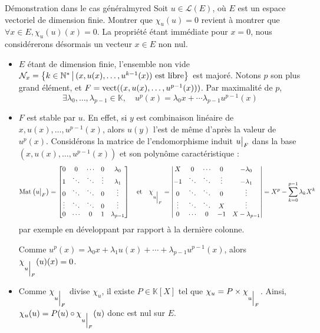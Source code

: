     \begin{demo}{Démonstration dans le cas général}{myred}
        Soit $u \in \mathcal{L}(E)$, où $E$ est un espace vectoriel de dimension finie. Montrer que $\chi_u(u) = 0$ revient à montrer que $\forall x \in E, \chi_u(u)(x) = 0$. La propriété étant immédiate pour $x = 0$, nous considérerons désormais un vecteur $x \in E$ non nul.
        \begin{itemize}
            \item $E$ étant de dimension finie, l’ensemble non vide $\mathcal{N}_x = \left\{k \in \mathbb{N}^* \, \middle| \, (x,u(x), \ldots, u^{k-1}(x)) \text{ est libre}\right\}$ est majoré. Notons $p$ son plus grand élément, et $F = \operatorname{vect}((x,u(x), \ldots, u^{p-1}(x)))$. Par maximalité de $p$, 
            \[ \exists \lambda_0,\ldots, \lambda_{p-1} \in \mathbb{K}, \quad u^p(x) = \lambda_0 x + \cdots \lambda_{p-1} u^{p-1}(x) \]   
            \item $F$ est stable par $u$. En effet, si $y$ est combinaison linéaire de $x,u(x), \ldots, u^{p-1}(x)$, alors $u(y)$ l’est de même d’après la valeur de $u^p(x)$. Considérons la matrice de l’endomorphisme induit $\restr{u}{F}$ dans la base $(x, u(x), \ldots, u^{p-1}(x))$ et son polynôme caractéristique :
            \[ \mat{}{\restr{u}{F}} = \begin{bmatrix}
                0 & 0 & \cdots & 0 & \lambda_0 \\
                1 & \ddots & \ddots & \vdots & \lambda_1 \\
                0 & \ddots & \ddots & 0 & \vdots \\
                \vdots & \ddots & \ddots & 0 & \vdots \\
                0 & \cdots & 0 & 1 & \lambda_{p-1}
            \end{bmatrix} \esp{et} \chi_{\restr{u}{F}} = \begin{vmatrix}
                X & 0 & \cdots & 0 & -\lambda_0 \\
                - 1 & \ddots & \ddots & \vdots & -\lambda_1 \\
                0 & \ddots & \ddots & 0 & \vdots \\
                \vdots & \ddots & \ddots & X & \vdots \\
                0 & \cdots & 0 & - 1 & X - \lambda_{p-1}
            \end{vmatrix} = X^p - \sum_{k=0}^{p-1} \lambda_k X^k \]   
            par exemple en développant par rapport à la dernière colonne.
            
            Comme $u^p(x) = \lambda_0 x + \lambda_1 u(x) + \cdots + \lambda_{p-1} u^{p-1}(x)$, alors $\chi_{\restr{u}{F}}(u)(x) = 0$.
            \item Comme $\chi_{\restr{u}{F}}$ divise $\chi_u$, il existe $P \in \mathbb{K}[X]$ tel que $\chi_{u} = P \times \chi_{\restr{u}{F}}$. Ainsi, $\chi_u(u) = P(u) \circ \chi_{\restr{u}{F}}(u)$ donc est nul sur $E$.
        \end{itemize}
    \end{demo}

